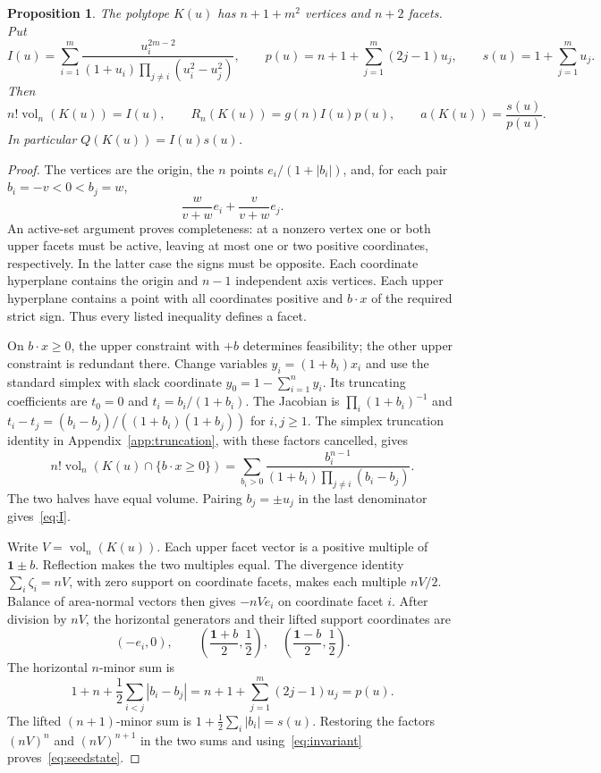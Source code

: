 \documentclass[11pt]{article}
\newtheorem{proposition}[theorem]{Proposition}
\DeclareMathOperator{\vol}{vol}
\begin{document}
\begin{proposition}\label{prop:seed}
The polytope $K(u)$ has $n+1+m^2$ vertices and $n+2$ facets. Put
\begin{equation}\label{eq:I}
 I(u)=\sum_{i=1}^m
 \frac{u_i^{2m-2}}{(1+u_i)\prod_{j\ne i}(u_i^2-u_j^2)},\qquad
 p(u)=n+1+\sum_{j=1}^m(2j-1)u_j,\qquad
 s(u)=1+\sum_{j=1}^m u_j.
\end{equation}
Then
\begin{equation}\label{eq:seedstate}
 n!\vol_n(K(u))=I(u),\qquad
 R_n(K(u))=g(n)I(u)p(u),\qquad a(K(u))=\frac{s(u)}{p(u)}.
\end{equation}
In particular $Q(K(u))=I(u)s(u)$.
\end{proposition}
\begin{proof}
The vertices are the origin, the $n$ points
$e_i/(1+|b_i|)$, and, for each pair $b_i=-v<0<b_j=w$,
\[
 \frac{w}{v+w}e_i+\frac{v}{v+w}e_j.
\]
An active-set argument proves completeness: at a nonzero vertex one or
both upper facets must be active, leaving at most one or two positive
coordinates, respectively. In the latter case the signs must be opposite.
Each coordinate hyperplane contains the origin and $n-1$ independent axis
vertices. Each upper hyperplane contains a point with all coordinates
positive and $b\cdot x$ of the required strict sign. Thus every listed
inequality defines a facet.

On $b\cdot x\ge0$, the upper constraint with $+b$ determines feasibility;
the other upper constraint is redundant there.
Change variables $y_i=(1+b_i)x_i$ and use the standard simplex with slack
coordinate $y_0=1-\sum_{i=1}^n y_i$. Its truncating coefficients are
$t_0=0$ and $t_i=b_i/(1+b_i)$. The Jacobian is
$\prod_i(1+b_i)^{-1}$ and
$t_i-t_j=(b_i-b_j)/((1+b_i)(1+b_j))$ for $i,j\ge1$.
The simplex truncation identity in Appendix~\ref{app:truncation}, with
these factors cancelled, gives
\[
 n!\vol_n(K(u)\cap\{b\cdot x\ge0\})
 =\sum_{b_i>0}\frac{b_i^{n-1}}{(1+b_i)\prod_{j\ne i}(b_i-b_j)}.
\]
The two halves have equal volume. Pairing $b_j=\pm u_j$ in the last
denominator gives~\eqref{eq:I}.

Write $V=\vol_n(K(u))$. Each upper facet vector is a positive multiple
of $\boldsymbol1\pm b$. Reflection makes the two multiples equal.
The divergence identity $\sum_i\zeta_i=nV$, with zero support on coordinate
facets, makes each multiple $nV/2$. Balance of area-normal vectors then
gives $-nVe_i$ on coordinate facet $i$. After division by $nV$, the
horizontal generators and their lifted support coordinates are
\[
 (-e_i,0),\qquad
 \left(\frac{\boldsymbol1+b}{2},\frac12\right),\quad
 \left(\frac{\boldsymbol1-b}{2},\frac12\right).
\]
The horizontal $n$-minor sum is
\[
 1+n+\frac12\sum_{i<j}|b_i-b_j|
 =n+1+\sum_{j=1}^m(2j-1)u_j=p(u).
\]
The lifted $(n+1)$-minor sum is $1+\frac12\sum_i|b_i|=s(u)$.
Restoring the factors $(nV)^n$ and $(nV)^{n+1}$ in the two sums and
using~\eqref{eq:invariant} proves~\eqref{eq:seedstate}.
\end{proof}
\end{document}
